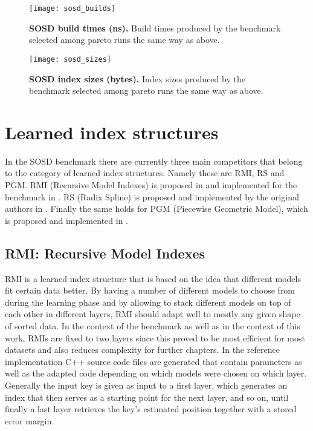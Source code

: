 \begin{figure}[!ht]
\centering
\texttt{[image: sosd\_builds]}
\caption[SOSD Build Times]{
  \textbf{SOSD build times (ns).}
  Build times produced by the benchmark selected among pareto runs the same way as above.
}
\label{fig:sosd_builds}
\end{figure}

\begin{figure}[!ht]
\centering
\texttt{[image: sosd\_sizes]}
\caption[SOSD Index Sizes]{
  \textbf{SOSD index sizes (bytes).}
  Index sizes produced by the benchmark selected among pareto runs the same way as above.
}
\label{fig:sosd_sizes}
\end{figure}

\section{Learned index structures}
In the SOSD benchmark there are currently three main competitors that belong to the category of learned index structures. Namely these are RMI, RS and PGM. RMI (Recursive Model Indexes) is proposed in \cite{rmi} and implemented for the benchmark in \cite{cdfshop}. RS (Radix Spline) is proposed and implemented by the original authors in \cite{radixspline}. Finally the same holds for PGM (Piecewise Geometric Model), which is proposed and implemented in \cite{pgm}.

\subsection{RMI: Recursive Model Indexes}
\label{sect:background:rmi}
RMI \cite{rmi} is a learned index structure that is based on the idea that different models fit certain data better. By having a number of different models to choose from during the learning phase and by allowing to stack different models on top of each other in different layers, RMI should adapt well to mostly any given shape of sorted data. In the context of the benchmark as well as in the context of this work, RMIs are fixed to two layers since this proved to be most efficient for most datasets and also reduces complexity for further chapters. In the reference implementation \cite{cdfshop} C++ source code files are generated that contain parameters as well as the adapted code depending on which models were chosen on which layer. Generally the input key is given as input to a first layer, which generates an index that then serves as a starting point for the next layer, and so on, until finally a last layer retrieves the key's estimated position together with a stored error margin.\\

